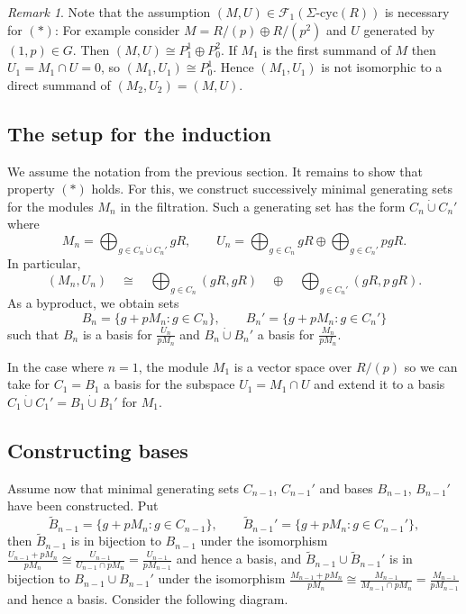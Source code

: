 \documentclass[twoside,leqno,12pt]{amsart}
\def\dotcup{\operatorname{\dot\cup}}
\def\SigCyc{\mbox{$\Sigma$-cyc}}
\theoremstyle{definition}
\theoremstyle{remark}
\newtheorem{rem}[thm]{Remark}
\numberwithin{equation}{section}
\begin{document}
  \begin{rem}
    Note that the assumption $(M,U)\in\mathcal F_1(\SigCyc(R))$ is necessary for $(*)$:
    For example consider $M=R/(p)\oplus R/(p^2)$ and $U$ generated
    by $(1,p)\in G$.  Then $(M,U)\cong P^1_1\oplus P^2_0$.
    If $M_1$ is the first summand of $M$ then $U_1=M_1\cap U=0$, so
    $(M_1,U_1)\cong P^1_0$.  Hence $(M_1,U_1)$ is not isomorphic to a direct summand of
    $(M_2,U_2)=(M,U)$.
  \end{rem}

\subsection{The setup for the induction}

We assume the notation from the previous section.
It remains to show that property $(*)$ holds.  For this,
we construct successively
minimal generating sets for the modules $M_n$ in the filtration.  Such a generating set
has the form $C_n\dotcup C_n'$ where
  $$M_n=\bigoplus_{g\in C_n\dotcup C_n'} gR,\qquad U_n=\bigoplus_{g\in C_n} gR\oplus
\bigoplus_{g\in C_n'} pgR.$$
In particular,
$$(M_n,U_n)\quad \cong\quad  \bigoplus_{g\in C_n}(gR,gR)\quad\oplus\quad
\bigoplus_{g\in C_n'} (gR,p\,gR).$$
As a byproduct, we obtain sets
$$B_n=\{g+pM_n:g\in C_n\},\qquad B_n'=\{g+pM_n:g\in C_n'\}$$
such that $B_n$ is a basis for $\frac{U_n}{pM_n}$ and
$B_n\dotcup B_n'$ a basis for $\frac{M_n}{pM_n}$.


In the case where $n=1$, the module $M_1$ is a vector space over $R/(p)$ so
we can take for $C_1=B_1$ a basis for the subspace $U_1=M_1\cap U$ and extend it to a basis
$C_1\dotcup C_1'=B_1\dotcup B_1'$ for $M_1$.

\subsection{Constructing bases}


Assume now that  minimal generating sets $C_{n-1}$, $C_{n-1}'$
and bases $B_{n-1}$, $B_{n-1}'$ have been constructed.
Put
$$\tilde B_{n-1}=\{g+pM_n:g\in C_{n-1}\},\qquad \tilde B_{n-1}'=\{g+pM_n:g\in C_{n-1}'\},$$
then $\tilde B_{n-1}$ is in bijection to $B_{n-1}$ under the isomorphism
$\frac{U_{n-1}+pM_n}{pM_n}\cong \frac{U_{n-1}}{U_{n-1}\cap pM_n}=\frac{U_{n-1}}{pM_{n-1}}$ and hence a
basis, and
$\tilde B_{n-1}\cup \tilde B_{n-1}'$ is in bijection to $B_{n-1}\cup B_{n-1}'$ under the
isomorphism $\frac{M_{n-1}+pM_n}{pM_n}\cong\frac{M_{n-1}}{M_{n-1}\cap pM_n}=\frac{M_{n-1}}{pM_{n-1}}$
and hence a basis.
Consider the following diagram.
\end{document}
